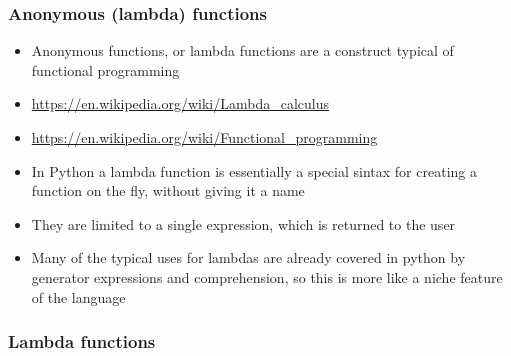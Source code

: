 \documentclass[9pt]{beamer}
\begin{document}
\begin{frame}
  \frametitle{Anonymous (lambda) functions}
  \begin{itemize}
    \item \alert{Anonymous functions}, or \alert{lambda functions} are a construct typical of \alert{functional programming}
    \item \url{https://en.wikipedia.org/wiki/Lambda_calculus}
    \item \url{https://en.wikipedia.org/wiki/Functional_programming}
    \item In Python a lambda function is essentially a special sintax for creating a function
          on the fly, without giving it a name
    \item They are limited to \alert{a single expression}, which is returned to the user
    \item Many of the typical uses for lambdas are already covered in python by generator expressions and comprehension,
          so this is more like a niche feature of the language
  \end{itemize}
  
\end{frame}


\begin{frame}
  \frametitle{Lambda functions}
  
\end{frame}
\end{document}
